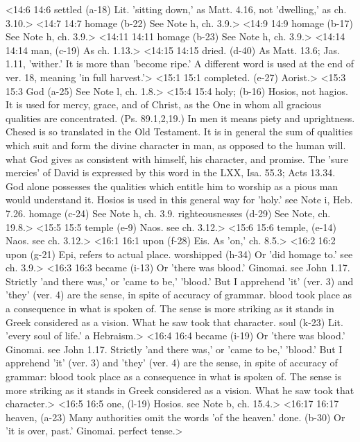 <14:6 14:6  settled (a-18)  Lit. 'sitting down,' as Matt. 4.16, not 'dwelling,' as ch. 3.10.>
<14:7 14:7  homage (b-22) See Note h, ch. 3.9.>
<14:9 14:9  homage (b-17) See Note h, ch. 3.9.>
<14:11 14:11  homage (b-23)  See Note h, ch. 3.9.>
<14:14 14:14  man, (c-19)  As ch. 1.13.>
<14:15 14:15  dried. (d-40)  As Matt. 13.6; Jas. 1.11, 'wither.' It is more than 'become  ripe.' A different word is used at the end of ver. 18, meaning  'in full harvest.'>
<15:1 15:1  completed. (e-27)  Aorist.>
<15:3 15:3  God (a-25)  See Note l, ch. 1.8.>
<15:4 15:4  holy; (b-16)  Hosios, not hagios. It is used for mercy, grace, and of  Christ, as the One in whom all gracious qualities are  concentrated. (Ps. 89.1,2,19.) In men it means piety and  uprightness. Chesed is so translated in the Old Testament. It  is in general the sum of qualities which suit and form the  divine character in man, as opposed to the human will. what God  gives as consistent with himself, his character, and promise.  The 'sure mercies' of David is expressed by this word in the  LXX, Isa. 55.3; Acts 13.34. God alone possesses the qualities  which entitle him to worship as a pious man would understand  it. Hosios is used in this general way for 'holy.' see Note  i, Heb. 7.26.
  homage (c-24)  See Note h, ch. 3.9.
  righteousnesses (d-29)  See Note, ch. 19.8.>
<15:5 15:5  temple (e-9)  Naos. see ch. 3.12.>
<15:6 15:6  temple, (e-14)  Naos. see ch. 3.12.>
<16:1 16:1  upon (f-28)  Eis. As 'on,' ch. 8.5.>
<16:2 16:2  upon (g-21)  Epi, refers to actual place.
  worshipped (h-34)  Or 'did homage to.' see ch. 3.9.>
<16:3 16:3  became (i-13)  Or 'there was blood.' Ginomai. see John 1.17. Strictly 'and  there was,' or 'came to be,' 'blood.' But I apprehend 'it'  (ver. 3) and 'they' (ver. 4) are the sense, in spite of  accuracy of grammar. blood took place as a consequence in what  is spoken of. The sense is more striking as it stands in Greek  considered as a vision. What he saw took that character.
  soul (k-23)  Lit. 'every soul of life.' a Hebraism.>
<16:4 16:4  became (i-19)  Or 'there was blood.' Ginomai. see John 1.17. Strictly 'and  there was,' or 'came to be,' 'blood.' But I apprehend 'it'  (ver. 3) and 'they' (ver. 4) are the sense, in spite of  accuracy of grammar: blood took place as a consequence in what  is spoken of. The sense is more striking as it stands in Greek  considered as a vision. What he saw took that character.>
<16:5 16:5  one, (l-19)  Hosios. see Note b, ch. 15.4.>
<16:17 16:17  heaven, (a-23)  Many authorities omit the words 'of the heaven.'
  done. (b-30)  Or 'it is over, past.' Ginomai. perfect tense.>
